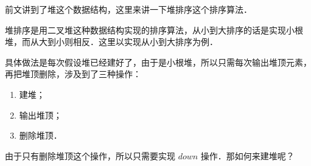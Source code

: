 
前文讲到了堆这个数据结构，这里来讲一下堆排序这个排序算法．

堆排序是用二叉堆这种数据结构实现的排序算法，从小到大排序的话是实现小根堆，而从大到小则相反．这里以实现从小到大排序为例．

具体做法是每次假设堆已经建好了，由于是小根堆，所以只需每次输出堆顶元素，再把堆顶删除，涉及到了三种操作：

\begin{enumerate}
\item 建堆；
\item 输出堆顶；
\item 删除堆顶．
\end{enumerate}

由于只有删除堆顶这个操作，所以只需要实现 $down$ 操作．那如何来建堆呢？